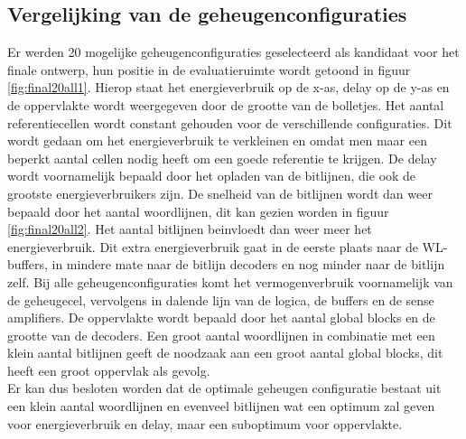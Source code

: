 \subsection{Vergelijking van de geheugenconfiguraties}
Er werden 20 mogelijke geheugenconfiguraties geselecteerd als kandidaat voor het finale ontwerp, hun positie in de evaluatieruimte wordt getoond in figuur \ref{fig:final20all1}. Hierop staat het energieverbruik op de x-as, delay op de y-as en de oppervlakte wordt weergegeven door de grootte van de bolletjes. Het aantal referentiecellen wordt constant gehouden voor de verschillende configuraties. Dit wordt gedaan om het energieverbruik te verkleinen en omdat men maar een beperkt aantal cellen nodig heeft om een goede referentie te krijgen. De delay wordt voornamelijk bepaald door het opladen van de bitlijnen, die ook de grootste energieverbruikers zijn. De snelheid van de bitlijnen wordt dan weer bepaald door het aantal woordlijnen, dit kan gezien worden in figuur \ref{fig:final20all2}. Het aantal bitlijnen beinvloedt dan weer meer het energieverbruik. Dit extra energieverbruik gaat in de eerste plaats naar de WL-buffers, in mindere mate naar de bitlijn decoders en nog minder naar de bitlijn zelf. Bij alle geheugenconfiguraties komt het vermogenverbruik voornamelijk van de geheugecel, vervolgens in dalende lijn van de logica, de buffers en de sense amplifiers. De oppervlakte wordt bepaald door het aantal global blocks en de grootte van de decoders. Een groot aantal woordlijnen in combinatie met een klein aantal bitlijnen geeft de noodzaak aan een groot aantal global blocks, dit heeft een groot oppervlak als gevolg.\\
Er kan dus besloten worden dat de optimale geheugen configuratie bestaat uit een klein aantal woordlijnen en evenveel bitlijnen wat een optimum zal geven voor energieverbruik en delay, maar een suboptimum voor oppervlakte.


